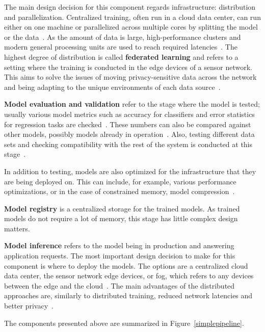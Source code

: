 The main design decision for this component regards infrastructure: distribution and parallelization. Centralized training, often run in a cloud data center, can run either on one machine or parallelized across multiple cores by splitting the model or the data~\cite{ben-nunDemystifyingParallelDistributed2019}. As the amount of data is large, high-performance clusters and modern general processing units are used to reach required latencies~\cite{iotsurvey}. The highest degree of distribution is called \textbf{federated learning} and refers to a setting where the training is conducted in the edge devices of a sensor network. This aims to solve the issues of moving privacy-sensitive data across the network and being adapting to the unique environments of each data source~\cite{iotsurvey}.

\textbf{Model evaluation and validation} refer to the stage where the model is tested; usually various model metrics such as accuracy for classifiers and error statistics for regression tasks are checked~\cite{iotsurvey}. These numbers can also be compared against other models, possibly models already in operation~\cite{googlemlops}. Also, testing different data sets and checking compatibility with the rest of the system is conducted at this stage~\cite{googlemlops}.
\enlargethispage{7mm}

In addition to testing, models are also optimized for the infrastructure that they are being deployed on. This can include, for example, various performance optimizations, or in the case of constrained memory, model compression~\cite{iotsurvey}.

\textbf{Model registry} is a centralized storage for the trained models. As trained models do not require a lot of memory, this stage has little complex design matters.

\textbf{Model inference} refers to the model being in production and answering application requests.
The most important design decision to make for this component is where to deploy the models. The options are a centralized cloud data center, the sensor network edge devices, or fog, which refers to any devices between the edge and the cloud~\cite{fogsurvey}. The main advantages of the distributed approaches are, similarly to distributed training, reduced network latencies and better privacy~\cite{szeEfficientProcessingDeep2017}.

The components presented above are summarized in Figure~\ref{simplepipeline}.

